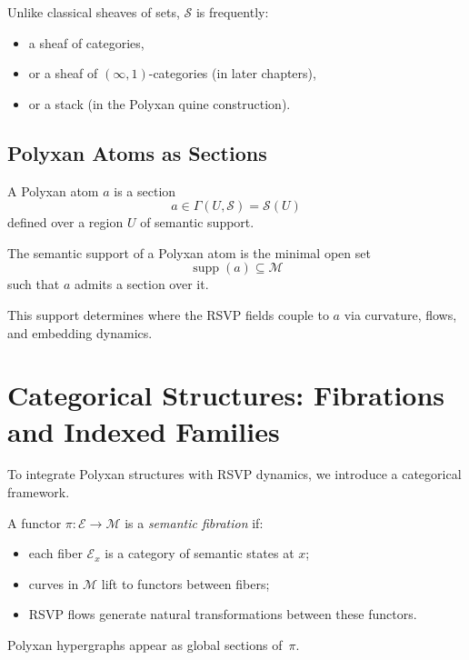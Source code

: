 Unlike classical sheaves of sets, $\mathscr{S}$ is frequently:
\begin{itemize}
  \item a sheaf of categories,
  \item or a sheaf of $(\infty,1)$-categories (in later chapters),
  \item or a stack (in the Polyxan quine construction).
\end{itemize}

\subsection{Polyxan Atoms as Sections}

A Polyxan atom $a$ is a section
\[
a \in \Gamma(U,\mathscr{S}) = \mathscr{S}(U)
\]
defined over a region $U$ of semantic support.

\begin{definition}
The semantic support of a Polyxan atom is the minimal open set
\[
\operatorname{supp}(a)
\subseteq \mathcal{M}
\]
such that $a$ admits a section over it.
\end{definition}

This support determines where the RSVP fields couple to $a$ via curvature,
flows, and embedding dynamics.

\section{Categorical Structures: Fibrations and Indexed Families}

To integrate Polyxan structures with RSVP dynamics, we introduce a categorical
framework.

\begin{definition}
A functor $\pi:\mathcal{E}\to\mathcal{M}$ is a
\emph{semantic fibration} if:
\begin{itemize}
  \item each fiber $\mathcal{E}_x$ is a category of semantic states at $x$;
  \item curves in $\mathcal{M}$ lift to functors between fibers;
  \item RSVP flows generate natural transformations between these functors.
\end{itemize}
\end{definition}

Polyxan hypergraphs appear as global sections of~$\pi$.

